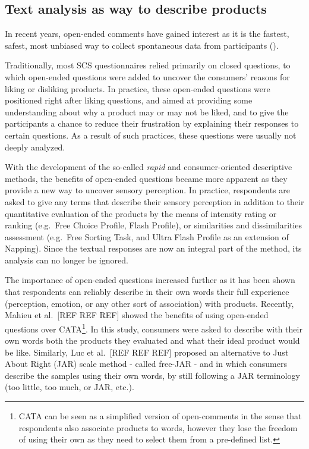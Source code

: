 \documentclass[
]{book}
\begin{document}
\hypertarget{text-analysis-as-way-to-describe-products}{%
\subsection{Text analysis as way to describe products}\label{text-analysis-as-way-to-describe-products}}

In recent years, open-ended comments have gained interest as it is the fastest, safest, most unbiased way to collect spontaneous data from participants (\citet{Piqueras2015}).

Traditionally, most SCS questionnaires relied primarily on closed questions, to which open-ended questions were added to uncover the consumers' reasons for liking or disliking products. In practice, these open-ended questions were positioned right after liking questions, and aimed at providing some understanding about why a product may or may not be liked, and to give the participants a chance to reduce their frustration by explaining their responses to certain questions. As a result of such practices, these questions were usually not deeply analyzed.

With the development of the so-called \emph{rapid} and consumer-oriented descriptive methods, the benefits of open-ended questions became more apparent as they provide a new way to uncover sensory perception. In practice, respondents are asked to give any terms that describe their sensory perception in addition to their quantitative evaluation of the products by the means of intensity rating or ranking (e.g.~Free Choice Profile, Flash Profile), or similarities and dissimilarities assessment (e.g.~Free Sorting Task, and Ultra Flash Profile as an extension of Napping). Since the textual responses are now an integral part of the method, its analysis can no longer be ignored.

The importance of open-ended questions increased further as it has been shown that respondents can reliably describe in their own words their full experience (perception, emotion, or any other sort of association) with products. Recently, Mahieu et al.~{[}REF REF REF{]} showed the benefits of using open-ended questions over CATA\footnote{CATA can be seen as a simplified version of open-comments in the sense that respondents also associate products to words, however they lose the freedom of using their own as they need to select them from a pre-defined list.}. In this study, consumers were asked to describe with their own words both the products they evaluated and what their ideal product would be like. Similarly, Luc et al.~{[}REF REF REF{]} proposed an alternative to Just About Right (JAR) scale method - called free-JAR - and in which consumers describe the samples using their own words, by still following a JAR terminology (too little, too much, or JAR, etc.).
\end{document}
